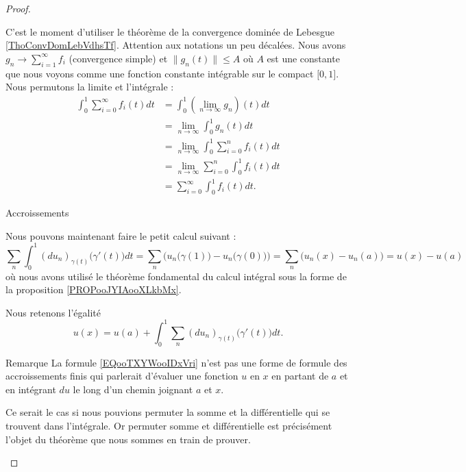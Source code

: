 \begin{proof}
\begin{subproof}
            C'est le moment d'utiliser le théorème de la convergence dominée de Lebesgue \ref{ThoConvDomLebVdhsTf}. Attention aux notations un peu décalées. Nous avons \( g_n\to \sum_{i=1}^{\infty}f_i\) (convergence simple) et \( \| g_n(t) \|\leq A\) où \( A\) est une constante que nous voyons comme une fonction constante intégrable sur le compact \( \mathopen[ 0 , 1 \mathclose]\). Nous permutons la limite et l'intégrale :
            \begin{subequations}
                \begin{align}
                \int_0^1\sum_{i=0}^{\infty}f_i(t)dt&=\int_0^1(\lim_{n\to \infty} g_n)(t)dt\\
                &=\lim_{n\to \infty} \int_0^1g_n(t)dt\\
                &=\lim_{n\to \infty} \int_{0}^1\sum_{i=0}^nf_i(t)dt\\
                &=\lim_{n\to \infty} \sum_{i=0}^n\int_0^1f_i(t)dt\\
                &=\sum_{i=0}^{\infty}\int_0^1f_i(t)dt.
                \end{align}
            \end{subequations}
        \item[Accroissements]

            Nous pouvons maintenant faire le petit calcul suivant :
            \begin{equation}
                \sum_n\int_0^1(du_n)_{\gamma(t)}\big( \gamma'(t) \big)dt=\sum_n\Big( u_n\big( \gamma(1) \big)-u_n\big( \gamma(0) \big) \Big)=\sum_n\big( u_n(x)-u_n(a) \big)=u(x)-u(a)
            \end{equation}
            où nous avons utilisé le théorème fondamental du calcul intégral sous la forme de la proposition \ref{PROPooJYIAooXLkbMx}.

            Nous retenons l'égalité
            \begin{equation}        \label{EQooTXYWooIDxVri}
                u(x)=u(a)+\int_0^1\sum_n(du_n)_{\gamma(t)}\big( \gamma'(t) \big)dt.
            \end{equation}
        \item[Remarque]
            La formule \eqref{EQooTXYWooIDxVri} n'est pas une forme de formule des accroissements finis qui parlerait d'évaluer une fonction \( u\) en \( x\) en partant de \( a\) et en intégrant \( du\) le long d'un chemin joignant \( a\) et \( x\).

            Ce serait le cas si nous pouvions permuter la somme et la différentielle qui se trouvent dans l'intégrale. Or permuter somme et différentielle est précisément l'objet du théorème que nous sommes en train de prouver.


\end{subproof}
\end{proof}
